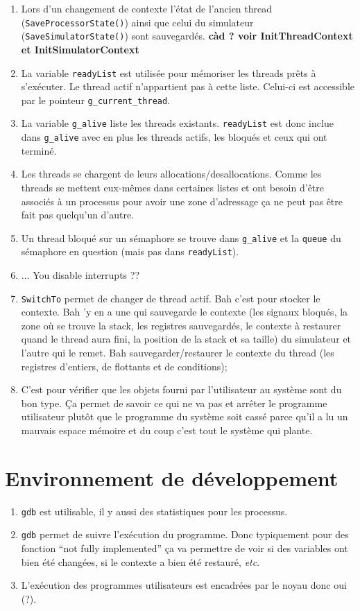 \documentclass{article}
\begin{document}
\begin{enumerate}
\item Lors d'un changement de contexte l'état de l'ancien thread ({\tt SaveProcessorState()}) ainsi que celui du simulateur ({\tt SaveSimulatorState()}) sont sauvegardés. {\bf càd ? voir InitThreadContext et InitSimulatorContext}
\item La variable {\tt readyList} est utilisée pour mémoriser les threads prêts à s'exécuter. Le thread actif n'appartient pas à cette liste. Celui-ci est accessible par le pointeur {\tt g\_current\_thread}.
\item La variable {\tt g\_alive} liste les threads existants. {\tt readyList} est donc inclue dans {\tt g\_alive} avec en plus les threads actifs, les bloqués et ceux qui ont terminé.
\item Les threads se chargent de leurs allocations/desallocations. Comme les threads se mettent eux-mêmes dans certaines listes et ont besoin d'être associés à un processus pour avoir une zone d'adressage ça ne peut pas être fait pas quelqu'un d'autre.
\item Un thread bloqué sur un sémaphore se trouve dans {\tt g\_alive} et la {\tt queue} du sémaphore en question (mais pas dans {\tt readyList}).
\item ... You disable interrupts ??
\item {\tt SwitchTo} permet de changer de thread actif. Bah c'est pour stocker le contexte. Bah 'y en a une qui sauvegarde le contexte (les signaux bloqués, la zone où se trouve la stack, les registres sauvegardés, le contexte à restaurer quand le thread aura fini, la position de la stack et sa taille) du simulateur et l'autre qui le remet. Bah sauvegarder/restaurer le contexte du thread (les registres d'entiers, de flottants et de conditions);
\item C'est pour vérifier que les objets fourni par l'utilisateur au système sont du bon type. Ça permet de savoir ce qui ne va pas et arrêter le programme utilisateur plutôt que le programme du système soit cassé parce qu'il a lu un mauvais espace mémoire et du coup c'est tout le système qui plante.
\end{enumerate}

\section{Environnement de développement}

\begin{enumerate}
\item {\tt gdb} est utilisable, il y aussi des statistiques pour les processus.
\item {\tt gdb} permet de suivre l'exécution du programme. Donc typiquement pour des fonction ``not fully implemented'' ça va permettre de voir si des variables ont bien été changées, si le contexte a bien été restauré, {\it etc}.
\item L'exécution des programmes utilisateurs est encadrées par le noyau donc oui (?).
\end{enumerate}
\end{document}

